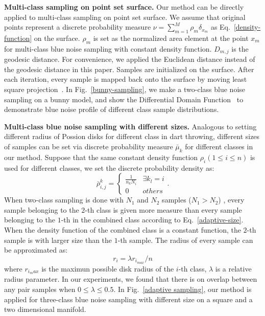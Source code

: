 \textbf{Multi-class sampling on point set surface.}
Our method can be directly applied to multi-class sampling on point set surface.
We assume that original points represent a discrete probability measure $\nu=\sum\limits_{m=1}^{M}\rho_m\delta_{x_m}$ as Eq.~\ref{density-function} on the surface.
$\rho_m$ is set as the normalized area element at the point $x_m$ for multi-class blue noise sampling with constant density function.
$D_{m,j}$ is the geodesic distance.
For convenience,
we applied the Euclidean distance instead of the geodesic distance in this paper.
Samples are initialized on the surface.
After each iteration,
every sample is mapped back onto the surface by
moving least square projection~\cite{alexa:2001:point}.
In Fig.~\ref{bunny-sampling},
we make a two-class blue noise sampling on a bunny model,
and show the Differential Domain Function~\cite{wei:2011:differential} to demonstrate blue noise profile of different class sample distributions.

\textbf{Multi-class blue noise sampling with different sizes.}
Analogous to setting different radius of Possion disks for different class in dart throwing,
different sizes of samples can be set  via discrete probability measure $\bar\mu_k$ for different classes in our method.
Suppose that the same constant density function $\rho_i (1\leq i\leq n)$ is used for different classes,
we set the discrete probability density as:
\begin{equation}\label{adaptive-size}
  \bar\rho_{i,j}^k= \left\{
  \begin{array} {cl}
  \frac{1}{n_kN_i} & \exists k_l = i \\
  0 & others
  \end{array} \right..
\end{equation}
When two-class sampling is done with $N_1$ and $N_2$ samples ($N_1>N_2$) ,
every sample belonging to the $2$-th class is given more measure than every sample belonging to the $1$-th in the combined class according to Eq.~\ref{adaptive-size}.
When the density function of the combined class is a constant function,
the $2$-th sample is with larger size than the $1$-th sample.
The radius of every sample can be approximated as:
\begin{equation*}
  r_i=\lambda r_{i_{max}}/n
\end{equation*}
where $r_{i_max}$ is the maximun possible disk radius of the $i$-th class,
$\lambda$ is a relative radius parameter.
In our experiments,
we found that there is on overlap between any pair samples when $0\leq\lambda\leq 0.5$.
In Fig.~\ref{adaptive sampling},
our method is applied for three-class blue noise sampling with different size on a square and a two dimensional manifold.


